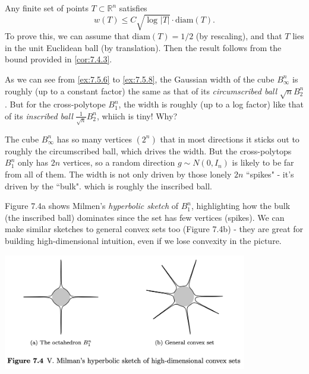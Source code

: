 \begin{example}
\label{ex:7.5.9}
Any finite set of points $T \subset \mathbb{R}^n$ satisfies 
\[ w(T) \leq C \sqrt{\log_{}{|T|}} \cdot \mathrm{diam}(T). \]
To prove this, we can assume that $\mathrm{diam}(T) = 1/2$ (by rescaling), and that $T$ lies in the unit 
Euclidean ball (by translation). Then the result follows from the bound provided in \cref{cor:7.4.3}.
\end{example}

\begin{remark}
As we can see from \cref{ex:7.5.6} to \cref{ex:7.5.8}, the Gaussian width of the cube $B_{\infty}^n$ is 
roughly (up to a constant factor) the same as that of its \textit{circumscribed ball} $\sqrt{n}B_2^n$. But 
for the cross-polytope $B_1^n$, the width is roughly (up to a log factor) like that of its \textit{inscribed 
ball} $\frac{1}{\sqrt{n}}B_2^n$, whiich is tiny! Why?

The cube $B_{\infty}^n$ has so many vertices $(2^n)$ that in most directions it sticks out to roughly the 
circumscribed ball, which drives the width. But the cross-polytops $B_1^n$ only has $2n$ vertices, so a random 
direction $g \sim N(0, I_n)$ is likely to be far from all of them. The width is not only driven by those lonely 
$2n$ ``spikes" - it's driven by the ``bulk". which is roughly the inscribed ball.

Figure 7.4a shows Milmen's \textit{hyperbolic sketch} of $B_1^n$, highlighting how the bulk (the inscribed ball) 
dominates since the set has few vertices (spikes). We can make similar sketches to general convex sets too 
(Figure 7.4b) - they are great for building high-dimensional intuition, even if we lose convexity in the picture.

\begin{center}
	\includegraphics[width=0.8\textwidth]{Chapter 7/fig7-4.png}
\end{center}
\end{remark}



